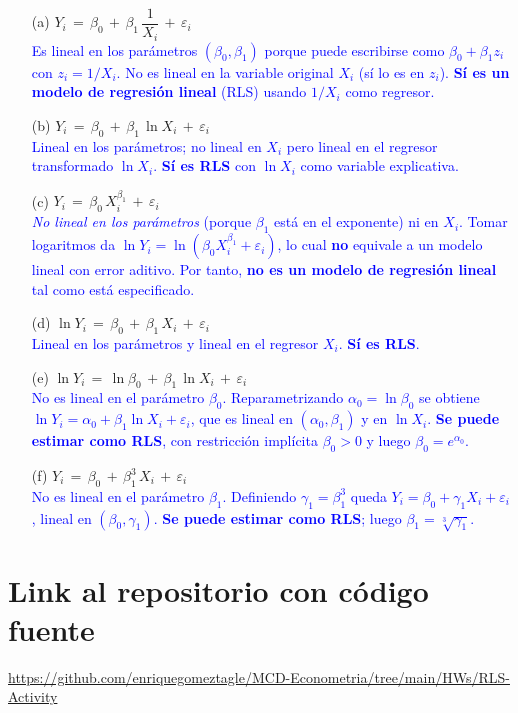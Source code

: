 \documentclass[10pt]{article}
\begin{document}
\begin{enumerate}
  \item[(a)] $Y_i \,=\, \beta_0 \, + \, \beta_1\,\dfrac{1}{X_i} \, + \, \varepsilon_i$\\ \textcolor{blue}{Es lineal en los parámetros $(\beta_0,\beta_1)$ porque puede escribirse como $\beta_0+\beta_1 z_i$ con $z_i=1/X_i$. No es lineal en la variable original $X_i$ (sí lo es en $z_i$). \textbf{Sí es un modelo de regresión lineal} (RLS) usando $1/X_i$ como regresor.}
  \item[(b)] $Y_i \,=\, \beta_0 \, + \, \beta_1\,\ln X_i \, + \, \varepsilon_i$\\ \textcolor{blue}{Lineal en los parámetros; no lineal en $X_i$ pero lineal en el regresor transformado $\ln X_i$. \textbf{Sí es RLS} con $\ln X_i$ como variable explicativa.}
  \item[(c)] $Y_i \,=\, \beta_0\, X_i^{\beta_1} \, + \, \varepsilon_i$\\ \textcolor{blue}{\emph{No lineal en los parámetros} (porque $\beta_1$ está en el exponente) ni en $X_i$. Tomar logaritmos da $\ln Y_i = \ln(\beta_0 X_i^{\beta_1} + \varepsilon_i)$, lo cual \textbf{no} equivale a un modelo lineal con error aditivo. Por tanto, \textbf{no es un modelo de regresión lineal} tal como está especificado.}
  \item[(d)] $\ln Y_i \,=\, \beta_0 \, + \, \beta_1\, X_i \, + \, \varepsilon_i$\\ \textcolor{blue}{Lineal en los parámetros y lineal en el regresor $X_i$. \textbf{Sí es RLS}.}
  \item[(e)] $\ln Y_i \,=\, \ln \beta_0 \, + \, \beta_1\,\ln X_i \, + \, \varepsilon_i$\\ \textcolor{blue}{No es lineal en el parámetro $\beta_0$. Reparametrizando $\alpha_0=\ln \beta_0$ se obtiene $\ln Y_i=\alpha_0+\beta_1\ln X_i+\varepsilon_i$, que es lineal en $(\alpha_0,\beta_1)$ y en $\ln X_i$. \textbf{Se puede estimar como RLS}, con restricción implícita $\beta_0>0$ y luego $\beta_0=e^{\alpha_0}$.}
  \item[(f)] $Y_i \,=\, \beta_0 \, + \, \beta_1^{3}\, X_i \, + \, \varepsilon_i$\\ \textcolor{blue}{No es lineal en el parámetro $\beta_1$. Definiendo $\gamma_1=\beta_1^3$ queda $Y_i=\beta_0+\gamma_1 X_i+\varepsilon_i$, lineal en $(\beta_0,\gamma_1)$. \textbf{Se puede estimar como RLS}; luego $\beta_1=\sqrt[3]{\gamma_1}$.}
\end{enumerate}

\section{Link al repositorio con código fuente}
\href{https://github.com/enriquegomeztagle/MCD-Econometria/tree/main/HWs/RLS-Activity}{https://github.com/enriquegomeztagle/MCD-Econometria/tree/main/HWs/RLS-Activity}
\end{document}
